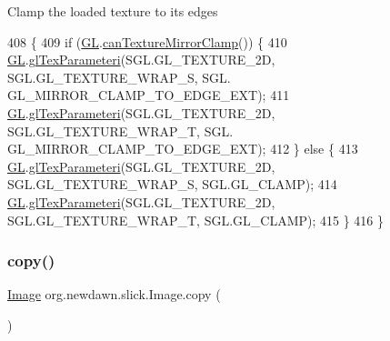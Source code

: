Clamp the loaded texture to it\textquotesingle{}s edges 
\begin{DoxyCode}
408                                \{
409         \textcolor{keywordflow}{if} (\mbox{\hyperlink{classorg_1_1newdawn_1_1slick_1_1_image_aafbab31355bec79e747f477e970dcda4}{GL}}.\mbox{\hyperlink{interfaceorg_1_1newdawn_1_1slick_1_1opengl_1_1renderer_1_1_s_g_l_a57e486bcf65ca2576b735e7b4fcd654b}{canTextureMirrorClamp}}()) \{
410             \mbox{\hyperlink{classorg_1_1newdawn_1_1slick_1_1_image_aafbab31355bec79e747f477e970dcda4}{GL}}.\mbox{\hyperlink{interfaceorg_1_1newdawn_1_1slick_1_1opengl_1_1renderer_1_1_s_g_l_a99abf6a580aac95c599916a61a4933d4}{glTexParameteri}}(SGL.GL\_TEXTURE\_2D, SGL.GL\_TEXTURE\_WRAP\_S, SGL.
      GL\_MIRROR\_CLAMP\_TO\_EDGE\_EXT);
411             \mbox{\hyperlink{classorg_1_1newdawn_1_1slick_1_1_image_aafbab31355bec79e747f477e970dcda4}{GL}}.\mbox{\hyperlink{interfaceorg_1_1newdawn_1_1slick_1_1opengl_1_1renderer_1_1_s_g_l_a99abf6a580aac95c599916a61a4933d4}{glTexParameteri}}(SGL.GL\_TEXTURE\_2D, SGL.GL\_TEXTURE\_WRAP\_T, SGL.
      GL\_MIRROR\_CLAMP\_TO\_EDGE\_EXT);
412         \} \textcolor{keywordflow}{else} \{
413             \mbox{\hyperlink{classorg_1_1newdawn_1_1slick_1_1_image_aafbab31355bec79e747f477e970dcda4}{GL}}.\mbox{\hyperlink{interfaceorg_1_1newdawn_1_1slick_1_1opengl_1_1renderer_1_1_s_g_l_a99abf6a580aac95c599916a61a4933d4}{glTexParameteri}}(SGL.GL\_TEXTURE\_2D, SGL.GL\_TEXTURE\_WRAP\_S, SGL.GL\_CLAMP);
414             \mbox{\hyperlink{classorg_1_1newdawn_1_1slick_1_1_image_aafbab31355bec79e747f477e970dcda4}{GL}}.\mbox{\hyperlink{interfaceorg_1_1newdawn_1_1slick_1_1opengl_1_1renderer_1_1_s_g_l_a99abf6a580aac95c599916a61a4933d4}{glTexParameteri}}(SGL.GL\_TEXTURE\_2D, SGL.GL\_TEXTURE\_WRAP\_T, SGL.GL\_CLAMP);
415         \}
416     \}
\end{DoxyCode}
\mbox{\label{classorg_1_1newdawn_1_1slick_1_1_image_a1a60f42d060227bc270a1a254eb36639}} 
\subsubsection{\texorpdfstring{copy()}{copy()}}
{\footnotesize\ttfamily \mbox{\hyperlink{classorg_1_1newdawn_1_1slick_1_1_image}{Image}} org.\+newdawn.\+slick.\+Image.\+copy (\begin{DoxyParamCaption}{ }\end{DoxyParamCaption})\hspace{0.3cm}{\ttfamily [inline]}}

